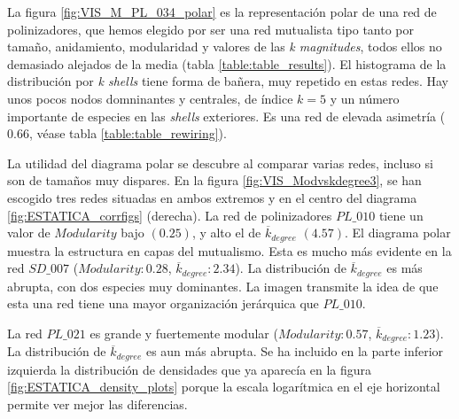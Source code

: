 La figura \ref{fig:VIS_M_PL_034_polar} es la representación polar de una red de polinizadores, que hemos elegido por ser una red mutualista tipo tanto por tamaño, anidamiento, modularidad y valores de las \textit{k magnitudes}, todos ellos no demasiado alejados de la media (tabla \ref{table:table_results}). El histograma de la distribución por \textit{k shells} tiene forma de bañera, muy repetido en estas redes. Hay unos pocos nodos domninantes y centrales, de índice $k = 5$ y un número importante de especies en las \textit{shells} exteriores. Es una red de elevada asimetría ($0.66$, véase tabla \ref{table:table_rewiring}).

La utilidad del diagrama polar se descubre al comparar varias redes, incluso si son de tamaños muy dispares. En la figura \ref{fig:VIS_Modvskdegree3}, se han escogido tres redes situadas en ambos extremos y en el centro del diagrama \ref{fig:ESTATICA_corrfigs} (derecha). La red de polinizadores $PL\_010$  tiene un valor de $Modularity$ bajo $(0.25)$, y alto el de $\overline {k}_{degree}$ $(4.57)$. El diagrama polar muestra la estructura en capas del mutualismo. Esta es mucho más evidente en la red $SD\_007$ ($Modularity:    0.28$, $\overline {k}_{degree}: 2.34$). La distribución de $\overline {k}_{degree}$ es más abrupta, con dos especies muy dominantes. La imagen transmite la idea de que esta una red tiene una mayor organización jerárquica que $PL\_010$.

La red $PL\_021$ es grande y fuertemente modular ($Modularity: 0.57$, $\overline {k}_{degree}: 1.23$). La distribución de $\overline {k}_{degree}$ es aun más abrupta. Se ha incluido en la parte inferior izquierda la distribución de densidades que ya aparecía en la figura \ref{fig:ESTATICA_density_plots} porque la escala logarítmica en el eje horizontal permite ver mejor las diferencias.

